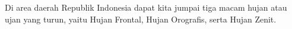 Di area daerah Republik Indonesia dapat kita jumpai tiga macam hujan atau ujan yang turun, yaitu Hujan Frontal, Hujan Orografis, serta Hujan Zenit.